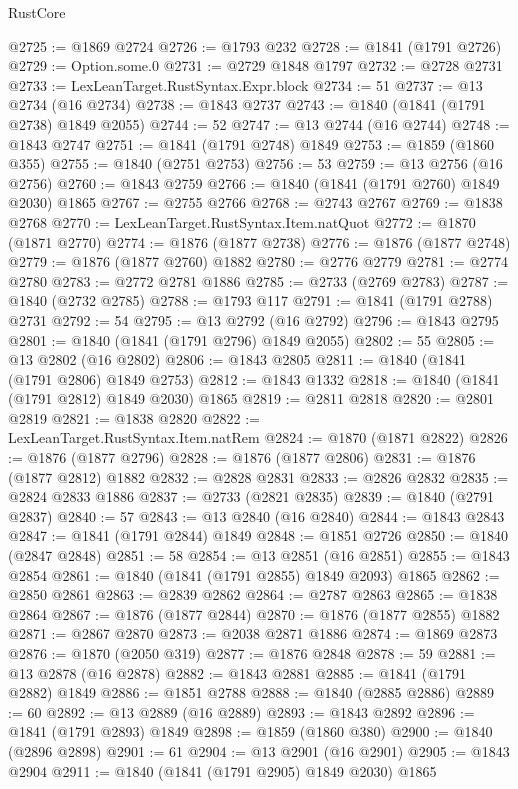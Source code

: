 \begin{lexlean}{RustCore}
\begin{coremodule}
@2725 := @1869 @2724
@2726 := @1793 @232
@2728 := @1841 (@1791 @2726)
@2729 := Option.some.{0}
@2731 := @2729 @1848 @1797
@2732 := @2728 @2731
@2733 := LexLeanTarget.RustSyntax.Expr.block
@2734 := 51
@2737 := @13 @2734 (@16 @2734)
@2738 := @1843 @2737
@2743 := @1840 (@1841 (@1791 @2738) @1849 @2055)
@2744 := 52
@2747 := @13 @2744 (@16 @2744)
@2748 := @1843 @2747
@2751 := @1841 (@1791 @2748) @1849
@2753 := @1859 (@1860 @355)
@2755 := @1840 (@2751 @2753)
@2756 := 53
@2759 := @13 @2756 (@16 @2756)
@2760 := @1843 @2759
@2766 := @1840 (@1841 (@1791 @2760) @1849 @2030) @1865
@2767 := @2755 @2766
@2768 := @2743 @2767
@2769 := @1838 @2768
@2770 := LexLeanTarget.RustSyntax.Item.natQuot
@2772 := @1870 (@1871 @2770)
@2774 := @1876 (@1877 @2738)
@2776 := @1876 (@1877 @2748)
@2779 := @1876 (@1877 @2760) @1882
@2780 := @2776 @2779
@2781 := @2774 @2780
@2783 := @2772 @2781 @1886
@2785 := @2733 (@2769 @2783)
@2787 := @1840 (@2732 @2785)
@2788 := @1793 @117
@2791 := @1841 (@1791 @2788) @2731
@2792 := 54
@2795 := @13 @2792 (@16 @2792)
@2796 := @1843 @2795
@2801 := @1840 (@1841 (@1791 @2796) @1849 @2055)
@2802 := 55
@2805 := @13 @2802 (@16 @2802)
@2806 := @1843 @2805
@2811 := @1840 (@1841 (@1791 @2806) @1849 @2753)
@2812 := @1843 @1332
@2818 := @1840 (@1841 (@1791 @2812) @1849 @2030) @1865
@2819 := @2811 @2818
@2820 := @2801 @2819
@2821 := @1838 @2820
@2822 := LexLeanTarget.RustSyntax.Item.natRem
@2824 := @1870 (@1871 @2822)
@2826 := @1876 (@1877 @2796)
@2828 := @1876 (@1877 @2806)
@2831 := @1876 (@1877 @2812) @1882
@2832 := @2828 @2831
@2833 := @2826 @2832
@2835 := @2824 @2833 @1886
@2837 := @2733 (@2821 @2835)
@2839 := @1840 (@2791 @2837)
@2840 := 57
@2843 := @13 @2840 (@16 @2840)
@2844 := @1843 @2843
@2847 := @1841 (@1791 @2844) @1849
@2848 := @1851 @2726
@2850 := @1840 (@2847 @2848)
@2851 := 58
@2854 := @13 @2851 (@16 @2851)
@2855 := @1843 @2854
@2861 := @1840 (@1841 (@1791 @2855) @1849 @2093) @1865
@2862 := @2850 @2861
@2863 := @2839 @2862
@2864 := @2787 @2863
@2865 := @1838 @2864
@2867 := @1876 (@1877 @2844)
@2870 := @1876 (@1877 @2855) @1882
@2871 := @2867 @2870
@2873 := @2038 @2871 @1886
@2874 := @1869 @2873
@2876 := @1870 (@2050 @319)
@2877 := @1876 @2848
@2878 := 59
@2881 := @13 @2878 (@16 @2878)
@2882 := @1843 @2881
@2885 := @1841 (@1791 @2882) @1849
@2886 := @1851 @2788
@2888 := @1840 (@2885 @2886)
@2889 := 60
@2892 := @13 @2889 (@16 @2889)
@2893 := @1843 @2892
@2896 := @1841 (@1791 @2893) @1849
@2898 := @1859 (@1860 @380)
@2900 := @1840 (@2896 @2898)
@2901 := 61
@2904 := @13 @2901 (@16 @2901)
@2905 := @1843 @2904
@2911 := @1840 (@1841 (@1791 @2905) @1849 @2030) @1865

\end{coremodule}
\end{lexlean}

